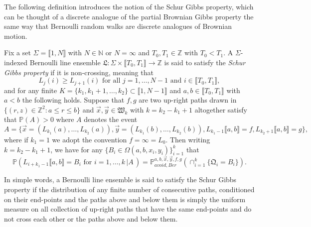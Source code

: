 The following definition introduces the notion of the Schur Gibbs property, which can be thought of a discrete analogue of the partial Brownian Gibbs property the same way that Bernoulli random walks are discrete analogues of Brownian motion. 
\begin{definition}\label{DefSGP}
Fix a set $\Sigma = \llbracket 1, N \rrbracket$ with $N \in \mathbb{N}$ or $N = \infty$ and $T_0, T_1\in \mathbb{Z}$ with $T_0 < T_1$. A $\Sigma$-indexed Bernoulli line ensemble $\mathfrak{L} : \Sigma \times \llbracket T_0, T_1 \rrbracket \rightarrow \mathbb{Z}$ is said to satisfy the {\em Schur Gibbs property} if it is non-crossing, meaning that 
$$ L_j(i) \geq L_{j+1}(i) \mbox{ for all $j = 1, \dots, N-1$ and $i \in \llbracket T_0, T_1 \rrbracket$},$$
and for any finite $K = \{k_1, k_1 + 1, \dots, k_2 \} \subset \llbracket 1, N - 1 \rrbracket$ and $a,b \in \llbracket T_0, T_1 \rrbracket$ with $a < b$ the following holds.  Suppose that $f, g$ are two up-right paths drawn in $\{ (r,z) \in \mathbb{Z}^2 : a \leq r \leq b\}$ and $\vec{x}, \vec{y} \in \mathfrak{W}_k$ with $k=k_2-k_1+1$ altogether satisfy that $\mathbb{P}(A) > 0$ where $A$ denotes the event $$A =\{ \vec{x} = ({L}_{k_1}(a), \dots, {L}_{k_2}(a)), \vec{y} = ({L}_{k_1}(b), \dots, {L}_{k_2}(b)), L_{k_1-1} \llbracket a,b \rrbracket = f, L_{k_2+1} \llbracket a,b \rrbracket = g \},$$
where if $k_1 = 1$ we adopt the convention $f = \infty = L_0$. Then writing $k = k_2 - k_1 + 1$, we have for any $\{ B_i \in \Omega(a, b, x_i , y_i) \}_{i = 1}^k$ that
\begin{equation}\label{SchurEq}
\mathbb{P}\left( L_{i + k_1-1}\llbracket a,b \rrbracket = B_{i} \mbox{ for $i = 1, \dots, k$} \, \vert  A \, \right) = \mathbb{P}_{avoid, Ber}^{a,b, \vec{x}, \vec{y}, f, g} \left( \cap_{i = 1}^k\{ \mathfrak{Q}_i = B_i \} \right).
\end{equation}
\end{definition}
\begin{remark}\label{RemSGB} In simple words, a Bernoulli line ensemble is said to satisfy the Schur Gibbs property if the distribution of any finite number of consecutive paths, conditioned on their end-points and the paths above and below them is simply the uniform measure on all collection of up-right paths that have the same end-points and do not cross each other or the paths above and below them. 
\end{remark}

